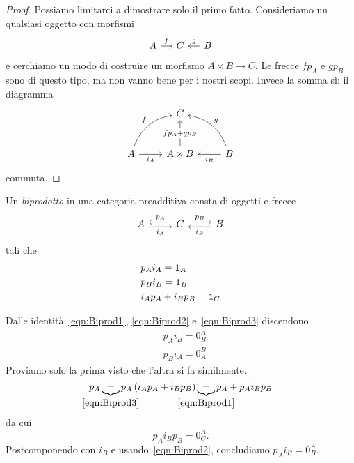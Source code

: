 \begin{proof}
  Possiamo limitarci a dimostrare solo il primo fatto. Consideriamo un
  qualsiasi oggetto con morfismi
  \[
    \begin{tikzcd}[column sep=small]
      A \ar["f", r] & C & B \ar["g", l, swap]
    \end{tikzcd}
  \]
  e cerchiamo un modo di costruire un morfismo \(A \times B \to C\). Le
  frecce \(f p_A\) e \(g p_B\) sono di questo tipo, ma non vanno bene
  per i nostri scopi. Invece la somma sì: il diagramma
  \[
    \begin{tikzcd}[row sep=large]
      & C \\
      A \ar["{i_A}", r, swap] \ar["f", ur, bend left] & A \times B
      \ar["{f p_A + g p_B}" description, u] & B \ar["{i_B}", l] \ar["g",
      ul, bend right, swap]
    \end{tikzcd}
  \]
  commuta.
\end{proof}

\begin{definition}\label{definition:Biprodotto}
  Un {\em biprodotto} in una categoria preadditiva consta di oggetti e
  frecce
  \[
    \begin{tikzcd}
      A \ar["{i_A}", r, shift right, swap] & C \ar["{p_A}", l, shift
      right, swap] \ar["{p_B}", r, shift left] & B \ar["{i_B}", l, shift
      left]
    \end{tikzcd}
  \]
  tali che
  \begin{align}
    & p_A i_A = \mathtt 1_A \label{eqn:Biprod1} \\
    & p_B i_B = \mathtt 1_B \label{eqn:Biprod2}\\
    & i_A p_A + i_B p_B = \mathtt 1_C \label{eqn:Biprod3}
  \end{align}
\end{definition}

\begin{remark}
  Dalle identità~\ref{eqn:Biprod1}, \ref{eqn:Biprod2}
  e~\ref{eqn:Biprod3} discendono
  \begin{align}
    & p_A i_B = 0_B^A \label{eqn:Biprod4} \\
    & p_B i_A = 0_A^B \label{eqn:Biprod5}
  \end{align}
  Proviamo solo la prima visto che l'altra si fa similmente.
  \[
    p_A \underbrace{=}_{\mathclap{\eqref{eqn:Biprod3}}} p_A \left( i_A
      p_A + i_B p_B \right)
    \underbrace{=}_{\mathclap{\eqref{eqn:Biprod1}}} p_A + p_A i_B p_B
  \]
  da cui
  \[
    p_A i_B p_B = 0_C^A .
  \]
  Postcomponendo con \(i_B\) e usando~\eqref{eqn:Biprod2}, concludiamo
  \(p_A i_B = 0_B^A\).
\end{remark}


